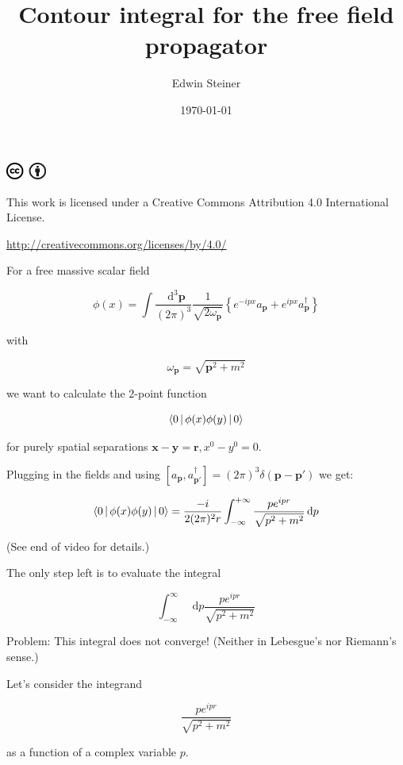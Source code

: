\documentclass{beamer}
\title{Contour integral for the free field propagator}
\author{Edwin Steiner}
\date{\today}
\newcommand{\sqrtpm}{\sqrt{p^2 + m^2}}
\newcommand{\integrand}{\frac{p e^{ipr}}{\sqrt{p^2 + m^2}}}
\newcommand{\vp}{\mathbf{p}}
\newcommand{\vx}{\mathbf{x}}
\newcommand{\vy}{\mathbf{y}}
\newcommand{\vr}{\mathbf{r}}
\newcommand{\vpp}{\mathbf{p}'}
\newcommand{\omvp}{\omega_{\vp}}
\newcommand{\ap}{a_{\vp}}
\newcommand{\adp}{a^\dagger_{\vp}}
\newcommand{\adpp}{a^\dagger_{\vpp}}
\newcommand{\diffop}{\mathop{}\!\mathrm{d}}
\newcommand{\dip}{\diffop p}
\newcommand{\intpthree}{\int \frac{\diffop^3\vp}{(2\pi)^3}}
\newcommand{\com}[2]{[{#1},{#2}]}
\newcommand{\phixy}{\Braket{0|\phi(x)\phi(y)|0}}
\newcommand{\intii}{\int_{-\infty}^{+\infty}}
\begin{document}

\begin{frame}
\titlepage
\begin{tiny}
\includegraphics[width=0.1\textwidth]{CC_BY.png}

\medskip
This work is licensed under a Creative Commons Attribution 4.0 International License.

\url{http://creativecommons.org/licenses/by/4.0/}
\end{tiny}
\end{frame}


\begin{frame}
For a free massive \alert{scalar field}

\pause
$$\phi(x) = \intpthree \frac{1}{\sqrt{2\omvp}} \left\{ e^{-ipx} \ap + e^{ipx} \adp \right\}$$

with

$$\omvp = \sqrt{\vp^2 + m^2}$$

\pause
we want to calculate the \alert{2-point function}

\pause
$$\phixy$$

\pause
for \alert{purely spatial} separations $\vx - \vy = \vr, x^0 - y^0 = 0$.

\end{frame}


\begin{frame}
Plugging in the fields and using $\com{\ap}{\adpp} = (2\pi)^3 \delta(\vp - \vpp)$ we get:

\pause
$$\phixy = \frac{-i}{2(2\pi)^2 r} \intii \frac{p e^{ipr}}{\sqrtpm} \dip$$

\pause
\medskip
(See end of video for details.)

\end{frame}



\begin{frame}
The only step left is to evaluate the integral

$$\int_{-\infty}^{\infty} \dip \integrand$$

\pause
Problem: \alert{This integral does not converge!} (Neither in Lebesgue's
nor Riemann's sense.)
\end{frame}


\begin{frame}
Let's consider the integrand

$$\integrand$$

as a function of a \alert{complex} variable $p$.

\end{frame}
\end{document}
